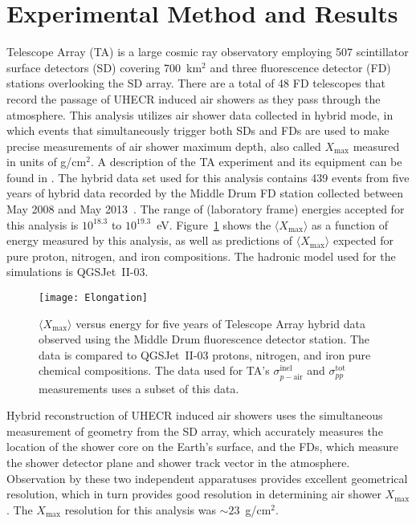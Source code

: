\documentclass[12pt]{article}
\newcommand{\xm}{$X_{\mathrm{max}}$}
\newcommand{\mxm}{$\langle X_{\mathrm{max}} \rangle$}
\newcommand{\spptotal}{$\sigma_{pp}^{\mathrm{tot}}$}
\newcommand{\spairinel}{$\sigma_{p-\mathrm{air}}^{\mathrm{inel}}$}
\begin{document}
\section{Experimental Method and Results}
Telescope Array (TA) is a large cosmic ray observatory employing 507
scintillator surface detectors (SD) covering 700~km$^{2}$ and three
fluorescence detector (FD) stations overlooking the SD array. There
are a total of 48 FD telescopes that record the passage of UHECR
induced air showers as they pass through the atmosphere. This analysis
utilizes air shower data collected in hybrid mode, in which events
that simultaneously trigger both SDs and FDs are used to make precise
measurements of air shower maximum depth, also called \xm{} measured
in units of g/cm$^{2}$. A description of the TA experiment and its
equipment can be found in
\cite{AbuZayyad:2000uu,AbuZayyad:2012kk,Tameda:2009zza,Tokuno:2012mi}. The
hybrid data set used for this analysis contains 439 events from five
years of hybrid data recorded by the Middle Drum FD station collected
between May 2008 and May 2013~\cite{Abbasi:2014sfa}. The range of
(laboratory frame) energies accepted for this analysis is $10^{18.3}$
to $10^{19.3}$~eV. Figure~\ref{fig:elongation} shows the \mxm{} as a
function of energy measured by this analysis, as well as predictions
of \mxm{} expected for pure proton, nitrogen, and iron
compositions. The hadronic model used for the simulations is
QGSJet~II-03.


\begin{figure}
  \centering
  \texttt{[image: Elongation]}
  \caption{\mxm{} versus energy for five years of Telescope Array
    hybrid data observed using the Middle Drum fluorescence detector
    station. The data is compared to QGSJet~II-03 protons, nitrogen,
    and iron pure chemical compositions. The data used for TA's
    \spairinel{} and \spptotal{} measurements uses a subset of this data.}
  \label{fig:elongation}

\end{figure}


Hybrid reconstruction of UHECR induced air showers uses the
simultaneous measurement of geometry from the SD array, which
accurately measures the location of the shower core on the Earth's
surface, and the FDs, which measure the shower detector plane and
shower track vector in the atmosphere. Observation by these two
independent apparatuses provides excellent geometrical resolution,
which in turn provides good resolution in determining air shower
\xm. The \xm{} resolution for this analysis was $\sim 23$~g/cm$^{2}$.
\end{document}
